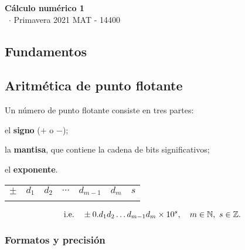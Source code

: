 \documentclass[8pt,a4paper]{extarticle}
\renewcommand{\csClass}{Cálculo numérico 1}
\renewcommand{\csClassCode}{MAT - 14400}
\renewcommand{\csTerm}{Primavera 2021}
\begin{document}
\begin{titlepage}
    \begin{center}
	\vspace*{1cm}
	\Huge
        \textbf{\csClass}
	\vspace{0.5cm} \\
	\Large
        \cs\ $\cdot$ \csTerm
        \vfill
        \csAuthorName
	\vspace{0.8cm}
        \csClassCode\\
        \csSchool     
    \end{center}
\end{titlepage}

\begin{multicols}{3}
\setcounter{page}{1}

\section*{Fundamentos}

\subsection{Aritmética de punto flotante}

Un número de punto flotante consiste en tres partes:

\begin{numberlist}
\item el \textbf{signo} ($+$ o $-$);
\item la \textbf{mantisa}, que contiene la cadena de bits significativos;
\item el \textbf{exponente}.
\end{numberlist}

\begin{center}	
\begin{tabular}{| c || c | c | c | c | c || c |}
	\hhline{-||-----||-}
	$\pm$ & $d_1$ & $d_2$ & $\cdots$ & $d_{m-1}$ & $d_m$ & $s$ \\
	\hhline{-||-----||-}
\end{tabular}
\end{center}

\[
\text{\normalfont i.e.} \quad \pm 0.d_1 d_2 \ldots d_{m-1} d_m \times 10^s, \quad m \in \mathbb{N},\ s \in \mathbb{Z}
.\] 

\subsubsection*{Formatos y precisión}


\end{multicols}
\end{document}
